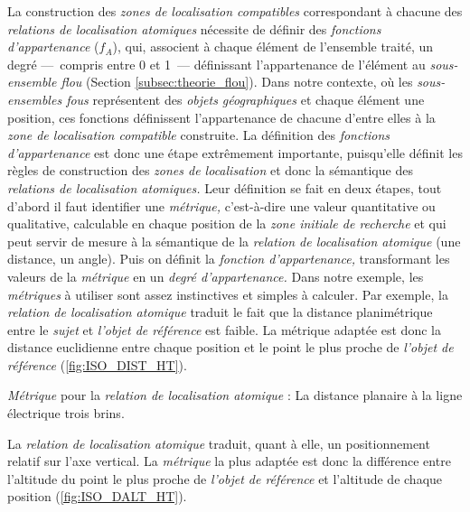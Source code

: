 La construction des \emph{zones de localisation compatibles}
correspondant à chacune des \emph{relations de localisation atomiques}
nécessite de définir des \emph{fonctions d'appartenance} ($f_A$), qui,
associent à chaque élément de l'ensemble traité, un degré ---~compris
entre 0 et 1~--- définissant l'appartenance de l'élément au
\emph{sous-ensemble flou} (Section \ref{subsec:theorie_flou}). Dans
notre contexte, où les \emph{sous-ensembles fous} représentent des
\emph{objets géographiques} et chaque élément une position, ces
fonctions définissent l'appartenance de chacune d'entre elles à la
\emph{zone de localisation compatible} construite. La définition des
\emph{fonctions d'appartenance} est donc une étape extrêmement
importante, puisqu'elle définit les règles de construction des
\emph{zones de localisation} et donc la sémantique des \emph{relations
  de localisation atomiques.} Leur définition se fait en deux étapes,
tout d'abord il faut identifier une \emph{métrique,} c'est-à-dire une
valeur quantitative ou qualitative, calculable en chaque position de
la \emph{zone initiale de recherche} et qui peut servir de mesure à la
sémantique de la \emph{relation de localisation atomique} (\eg une
distance, un angle). Puis on définit la \emph{fonction
  d'appartenance,} transformant les valeurs de la \emph{métrique} en
un \emph{degré d'appartenance.} Dans notre exemple, les
\emph{métriques} à utiliser sont assez instinctives et simples à
calculer. Par exemple, la \emph{relation de localisation atomique}
traduit le fait que la distance planimétrique entre le \emph{sujet} et
\emph{l'objet de référence} est faible. La métrique adaptée est donc
la distance euclidienne entre chaque position et le point le plus
proche de \emph{l'objet de référence} (\autoref{fig:ISO_DIST_HT}).

\begin{carte}
  \centering
  
  \caption{\emph{Métrique} pour la \emph{relation de localisation
      atomique}
    \protect{}
    : La distance planaire à la ligne électrique trois brins.}
  \label{fig:ISO_DIST_HT}
\end{carte}

La \emph{relation de localisation atomique}
 traduit,
quant à elle, un positionnement relatif sur l'axe vertical. La
\emph{métrique} la plus adaptée est donc la différence entre
l'altitude du point le plus proche de \emph{l'objet de référence} et
l'altitude de chaque position (\autoref{fig:ISO_DALT_HT}).

